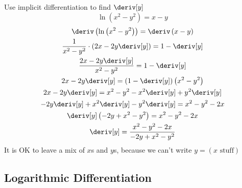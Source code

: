 \begin{example}
    Use implicit differentiation to find $\deriv[y]$
    \begin{equation*}
        \ln\left(x^2 - y^2\right) = x - y
    \end{equation*}
    \begin{gather*}
        \deriv\left(\ln\left(x^2 - y^2\right)\right) = \deriv\left(x - y\right) \\
        \dfrac{1}{x^2 - y^2} \cdot \left(2x - 2y \deriv[y]\right) = 1 - \deriv[y] \\
        \dfrac{2x - 2y \deriv[y]}{x^2 - y^2} = 1 - \deriv[y] \\
        2x - 2y \deriv[y] = \left(1 - \deriv[y]\right)\left(x^2 - y^2\right) \\
        2x - 2y \deriv[y] = x^2 - y^2 - x^2\deriv[y] + y^2\deriv[y] \\
        -2y \deriv[y] + x^2\deriv[y] - y^2\deriv[y] = x^2 - y^2 - 2x \\
        \deriv[y]\left(-2y + x^2 - y^2\right) = x^2 - y^2 - 2x \\
        \deriv[y] = \dfrac{x^2 - y^2 -2x}{-2y + x^2 - y^2}
    \end{gather*}
    It is OK to leave a mix of $x$s and $y$s, because we can't write $y = \left(x \text{ stuff}\right)$
\end{example}
\subsection{Logarithmic Differentiation}
